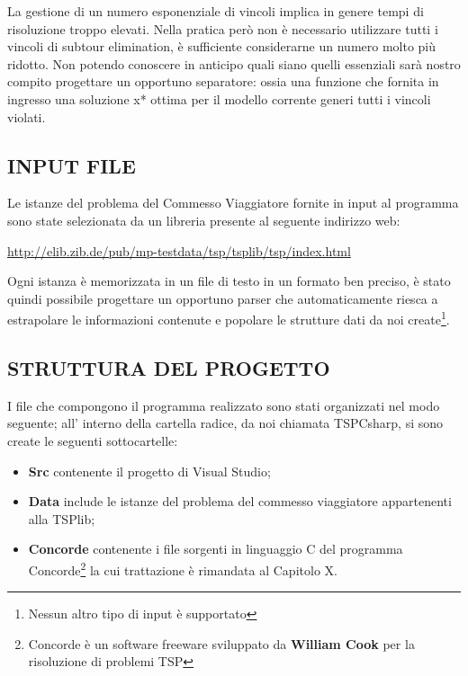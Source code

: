 \documentclass[11pt]{article}
\begin{document}
La gestione di un numero esponenziale di vincoli implica in genere tempi di risoluzione troppo elevati. Nella pratica però non è necessario utilizzare tutti i vincoli di subtour elimination, è sufficiente considerarne un numero molto più ridotto. Non potendo conoscere in anticipo quali siano quelli essenziali sarà nostro compito progettare un opportuno separatore: ossia una funzione che fornita in ingresso una soluzione x* ottima per il modello corrente generi tutti i vincoli violati.

\subsection*{INPUT FILE}

Le istanze del problema del Commesso Viaggiatore fornite in input al programma sono state selezionata da un libreria presente al seguente indirizzo web: 

\begin{center}
\href{http://elib.zib.de/pub/mp-testdata/tsp/tsplib/tsp/index.html}{http://elib.zib.de/pub/mp-testdata/tsp/tsplib/tsp/index.html}
\end{center}

Ogni istanza è memorizzata in un file di testo in un formato ben preciso, è stato quindi possibile progettare un opportuno parser che automaticamente riesca a estrapolare le informazioni contenute e popolare le strutture dati da noi create\footnote{Nessun altro tipo di input è supportato}.

\subsection*{STRUTTURA DEL PROGETTO}

I file che compongono il programma realizzato sono stati organizzati nel modo seguente; all' interno della cartella radice, da noi chiamata TSPCsharp, si sono create le seguenti sottocartelle:

\begin{itemize}
\item \textbf{Src} contenente il progetto di Visual Studio;
\item \textbf{Data} include le istanze del problema del commesso viaggiatore appartenenti alla TSPlib;
\item \textbf{Concorde} contenente i file sorgenti in linguaggio C del programma Concorde\footnote{Concorde è un software freeware sviluppato da \textbf{William Cook} per la risoluzione di problemi TSP} la cui trattazione è rimandata al Capitolo X.
\end{itemize}
\end{document}
